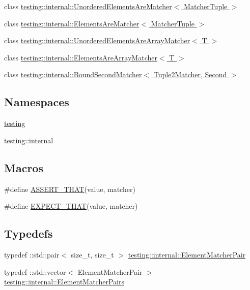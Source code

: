 \begin{DoxyCompactItemize}
\item 
class \hyperlink{classtesting_1_1internal_1_1UnorderedElementsAreMatcher}{testing\+::internal\+::\+Unordered\+Elements\+Are\+Matcher$<$ Matcher\+Tuple $>$}
\item 
class \hyperlink{classtesting_1_1internal_1_1ElementsAreMatcher}{testing\+::internal\+::\+Elements\+Are\+Matcher$<$ Matcher\+Tuple $>$}
\item 
class \hyperlink{classtesting_1_1internal_1_1UnorderedElementsAreArrayMatcher}{testing\+::internal\+::\+Unordered\+Elements\+Are\+Array\+Matcher$<$ T $>$}
\item 
class \hyperlink{classtesting_1_1internal_1_1ElementsAreArrayMatcher}{testing\+::internal\+::\+Elements\+Are\+Array\+Matcher$<$ T $>$}
\item 
class \hyperlink{classtesting_1_1internal_1_1BoundSecondMatcher}{testing\+::internal\+::\+Bound\+Second\+Matcher$<$ Tuple2\+Matcher, Second $>$}
\end{DoxyCompactItemize}
\subsection*{Namespaces}
\begin{DoxyCompactItemize}
\item 
 \hyperlink{namespacetesting}{testing}
\item 
 \hyperlink{namespacetesting_1_1internal}{testing\+::internal}
\end{DoxyCompactItemize}
\subsection*{Macros}
\begin{DoxyCompactItemize}
\item 
\#define \hyperlink{gmock-matchers_8h_a41d888579850c16583baea33ee8d057e}{A\+S\+S\+E\+R\+T\+\_\+\+T\+H\+AT}(value,  matcher)
\item 
\#define \hyperlink{gmock-matchers_8h_ac31e206123aa702e1152bb2735b31409}{E\+X\+P\+E\+C\+T\+\_\+\+T\+H\+AT}(value,  matcher)
\end{DoxyCompactItemize}
\subsection*{Typedefs}
\begin{DoxyCompactItemize}
\item 
typedef \+::std\+::pair$<$ size\+\_\+t, size\+\_\+t $>$ \hyperlink{namespacetesting_1_1internal_a109863545f08651178bf0f520aebd33b}{testing\+::internal\+::\+Element\+Matcher\+Pair}
\item 
typedef \+::std\+::vector$<$ Element\+Matcher\+Pair $>$ \hyperlink{namespacetesting_1_1internal_a0038618710c01a71150887dc7cfb0a29}{testing\+::internal\+::\+Element\+Matcher\+Pairs}
\end{DoxyCompactItemize}
